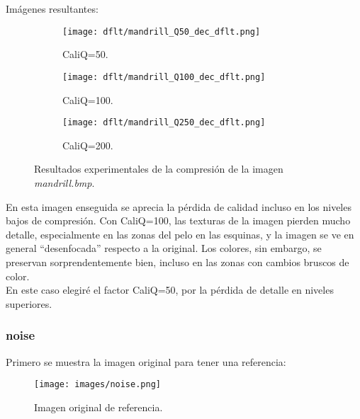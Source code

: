 \documentclass[12pt,a4paper]{article}
\begin{document}
Imágenes resultantes:
\begin{figure}   [H]
    \begin{subfigure}{0.30\textwidth}
        \centering
        \texttt{[image: dflt/mandrill\_Q50\_dec\_dflt.png]}
        \caption{CaliQ=50.}
        
    \end{subfigure}
    \hfill
    \begin{subfigure}{0.30\textwidth}
        \centering
        \texttt{[image: dflt/mandrill\_Q100\_dec\_dflt.png]}
        \caption{CaliQ=100.}
        
    \end{subfigure}
    \hfill
    \begin{subfigure}{0.30\textwidth}
        \centering
        \texttt{[image: dflt/mandrill\_Q250\_dec\_dflt.png]}
        \caption{CaliQ=200.}
        
    \end{subfigure}
    
    \caption[Resultados experimentales - mandrill]{Resultados experimentales de la compresión de la imagen \textit{mandrill.bmp}.}
    
\end{figure}

En esta imagen enseguida se aprecia la pérdida de calidad incluso en los niveles bajos de compresión. Con CaliQ=100, las texturas de la imagen pierden mucho detalle, especialmente en las zonas del pelo en las esquinas, y la imagen se ve en general ``desenfocada'' respecto a la original. Los colores, sin embargo, se preservan sorprendentemente bien, incluso en las zonas con cambios bruscos de color.\\

En este caso elegiré el factor CaliQ=50, por la pérdida de detalle en niveles superiores.\\


\subsubsection{noise}
Primero se muestra la imagen original para tener una referencia:
\begin{figure}[H]
    \centering
    \texttt{[image: images/noise.png]}
    \caption[Referencia - noise]{Imagen original de referencia.}
    
\end{figure}
    
    \vspace{0.5cm}
\end{document}
